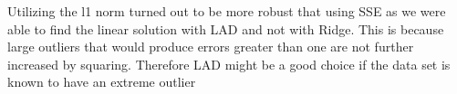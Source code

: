 \documentclass[10pt,twocolumn]{article}
\begin{document}
Utilizing the l1 norm turned out to be more robust that using SSE as we were able to find the linear solution with LAD and not with Ridge. This is because large outliers that would produce errors greater than one are not further increased by squaring. Therefore LAD might be a good choice if the data set is known to have an extreme outlier
 
 
\end{document}
